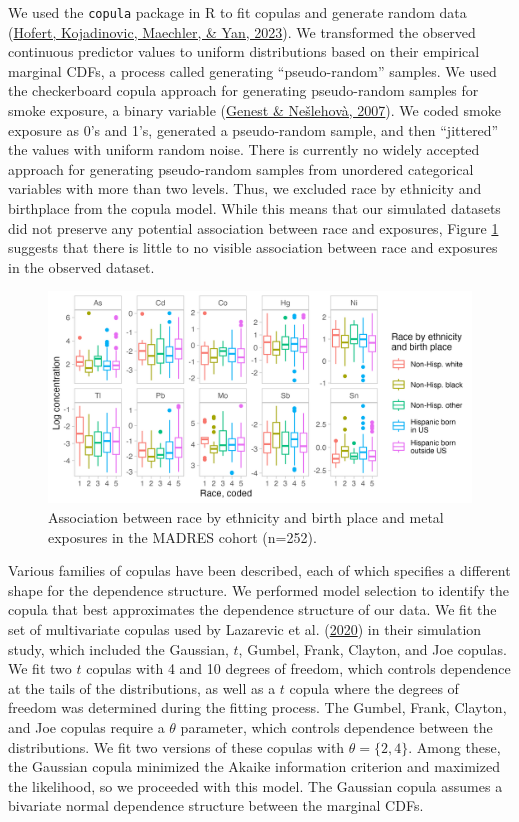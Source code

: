 \documentclass[12pt, twoside]{amherstthesis}
\begin{document}
We used the \texttt{copula} package in R to fit copulas and generate random data (\protect\hyperlink{ref-hofert_copula_2023}{Hofert, Kojadinovic, Maechler, \& Yan, 2023}). We transformed the observed continuous predictor values to uniform distributions based on their empirical marginal CDFs, a process called generating ``pseudo-random'' samples. We used the checkerboard copula approach for generating pseudo-random samples for smoke exposure, a binary variable (\protect\hyperlink{ref-genest_primer_2007}{Genest \& Nešlehovà, 2007}). We coded smoke exposure as 0's and 1's, generated a pseudo-random sample, and then ``jittered'' the values with uniform random noise. There is currently no widely accepted approach for generating pseudo-random samples from unordered categorical variables with more than two levels. Thus, we excluded race by ethnicity and birthplace from the copula model. While this means that our simulated datasets did not preserve any potential association between race and exposures, Figure \ref{fig:raceexp} suggests that there is little to no visible association between race and exposures in the observed dataset.
\begin{figure}

{\centering \includegraphics[width=0.75\linewidth]{figures/ch4_race_exp} 

}

\caption{Association between race by ethnicity and birth place and metal exposures in the MADRES cohort (n=252).}\label{fig:raceexp}
\end{figure}
Various families of copulas have been described, each of which specifies a different shape for the dependence structure. We performed model selection to identify the copula that best approximates the dependence structure of our data. We fit the set of multivariate copulas used by Lazarevic et al. (\protect\hyperlink{ref-lazarevic_performance_2020}{2020}) in their simulation study, which included the Gaussian, \(t\), Gumbel, Frank, Clayton, and Joe copulas. We fit two \(t\) copulas with 4 and 10 degrees of freedom, which controls dependence at the tails of the distributions, as well as a \(t\) copula where the degrees of freedom was determined during the fitting process. The Gumbel, Frank, Clayton, and Joe copulas require a \(\theta\) parameter, which controls dependence between the distributions. We fit two versions of these copulas with \(\theta=\{2, 4\}\). Among these, the Gaussian copula minimized the Akaike information criterion and maximized the likelihood, so we proceeded with this model. The Gaussian copula assumes a bivariate normal dependence structure between the marginal CDFs.
\end{document}
